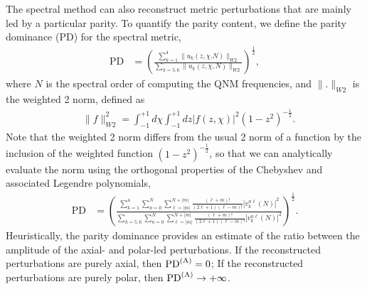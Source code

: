 \documentclass[aps,prx,amsmath,floats,floatfix,twocolumn,
  superscriptaddress,nofootinbib,showpacs]{revtex4-1}
\begin{document}
The spectral method can also reconstruct metric perturbations that are mainly led by a particular parity. 
To quantify the parity content, we define the parity dominance (PD) for the spectral metric, 
\begin{equation}\label{eq:PD_01}
\begin{split}
\text{PD} & = \left( \frac{\displaystyle \sum_{k=1}^{4} \| u_k(z, \chi. N)\|_{W2}}{\displaystyle \sum_{k=5, 6} \| u_k(z, \chi, N)\|_{W2}}\right)^{\frac{1}{2}}, 
\end{split}
\end{equation} 
where $N$ is the spectral order of computing the QNM frequencies, and $\| . \|_{W2}$ is the weighted 2 norm, defined as 
\begin{equation}\label{eq:W2_norm}
\begin{split}
& \| f\|^2_{W2} = \int_{-1}^{+1} d\chi \int_{-1}^{+1} dz |f(z, \chi)|^2\left( 1 - z^2 \right)^{-\frac{1}{2}}. 
\end{split}
\end{equation}
Note that the weighted 2 norm differs from the usual 2 norm of a function by the inclusion of the weighted function $(1-z^2)^{-\frac{1}{2}}$, so that we can analytically evaluate the norm using the orthogonal properties of the Chebyshev and associated Legendre polynomials, 
\begin{align}
\label{eq:PD_02}
\text{PD} 
& = \left(\frac{\displaystyle \sum_{k=1}^{4} \sum_{n=0}^{N} \sum_{\ell = |m|}^{N+|m|} \frac{(\ell+m)!}{(2\ell+1)(\ell-m)!} |v_k^{n \ell}(N)|^2}{\displaystyle \sum_{k=5, 6} \sum_{n=0}^{N} \sum_{\ell = |m|}^{N+|m|} \frac{(\ell+m)!}{(2\ell+1)(\ell-m)!} |v_k^{n \ell}(N)|^2}\right)^{\frac{1}{2}}. 
\end{align}
Heuristically, the parity dominance provides an estimate of the ratio between the amplitude of the axial- and polar-led perturbations. 
If the reconstructed perturbations are purely axial, then $\text{PD}^{\rm (A)} = 0$; If the reconstructed perturbations are purely polar, then $\text{PD}^{\rm (A)} \rightarrow + \infty$.  
\end{document}
